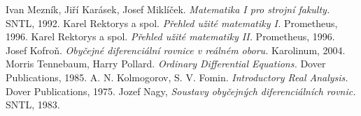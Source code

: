 \documentclass[openany,a4paper,10pt]{book}
\begin{document}







\begin{thebibliography}{10}
   Ivan Mezník, Jiří Karásek, Josef Miklíček.
   \emph{Matematika I pro strojní fakulty.}
   SNTL, 1992.
   Karel Rektorys a spol.
   \emph{Přehled užité matematiky I.}
   Prometheus, 1996.
   Karel Rektorys a spol.
   \emph{Přehled užité matematiky II.}
   Prometheus, 1996.
   Josef Kofroň.
   \emph{Obyčejné diferenciální rovnice v reálném oboru.}
   Karolinum, 2004.
   Morris Tennebaum, Harry Pollard.
   \emph{Ordinary Differential Equations.}
   Dover Publications, 1985.
   A. N. Kolmogorov, S. V. Fomin.
   \emph{Introductory Real Analysis.}
   Dover Publications, 1975.
   Jozef Nagy,
   \emph{Soustavy obyčejných diferenciálních rovnic.}
   SNTL, 1983.
\end{thebibliography}
\end{document}
